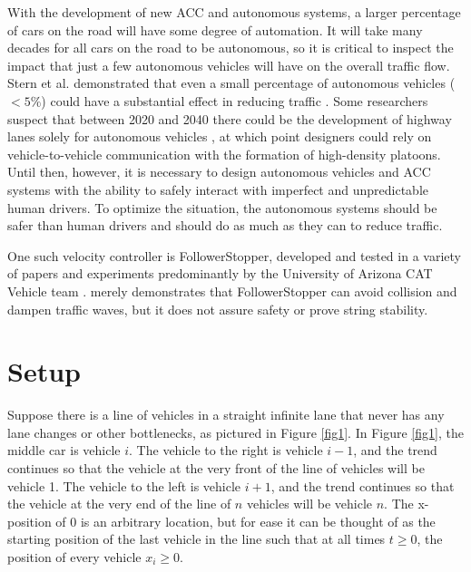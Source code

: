 \documentclass[conference]{IEEEtran}
\begin{document}
With the development of new ACC and autonomous systems, a larger percentage of cars on the road will have some degree of automation. It will take many decades for all cars on the road to be autonomous, so it is critical to inspect the impact that just a few autonomous vehicles will have on the overall traffic flow. Stern et al. demonstrated that even a small percentage of autonomous vehicles ($<5\%$) could have a substantial effect in reducing traffic \cite{stern2018dissipation}. Some researchers suspect that between 2020 and 2040 there could be the development of highway lanes solely for autonomous vehicles \cite{litman2017autonomous}, at which point designers could rely on vehicle-to-vehicle communication with the formation of high-density platoons. Until then, however, it is necessary to design autonomous vehicles and ACC systems with the ability to safely interact with imperfect and unpredictable human drivers. To optimize the situation, the autonomous systems should be safer than human drivers and should do as much as they can to reduce traffic.

One such velocity controller is FollowerStopper, developed and tested in a variety of papers and experiments predominantly by the University of Arizona CAT Vehicle team \cite{stern2018dissipation, bhadani2019real, bhadani2018dissipation}. \cite{bhadani2018dissipation} merely demonstrates that FollowerStopper can avoid collision and dampen traffic waves, but it does not assure safety or prove string stability.





\section{Setup}
Suppose there is a line of vehicles in a straight infinite lane that never has any lane changes or other bottlenecks, as pictured in Figure \ref{fig1}. In Figure \ref{fig1}, the middle car is vehicle $i$. The vehicle to the right is vehicle $i-1$, and the trend continues so that the vehicle at the very front of the line of vehicles will be vehicle 1. The vehicle to the left is vehicle $i+1$, and the trend continues so that the vehicle at the very end of the line of $n$ vehicles will be vehicle $n$. The x-position of 0 is an arbitrary location, but for ease it can be thought of as the starting position of the last vehicle in the line such that at all times $t\geq 0$, the position of every vehicle $x_i\geq 0$.
\end{document}
